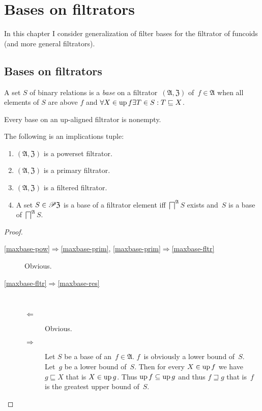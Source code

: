 \chapter{Bases on filtrators}

In this chapter I consider generalization of filter bases
for the filtrator of funcoids (and more general filtrators).

\section{Bases on filtrators}

\begin{defn}
  A set $S$ of binary relations is a \emph{base} on a filtrator~$(\mathfrak{A},\mathfrak{Z})$
  of~$f\in\mathfrak{A}$ when all elements
  of $S$ are above $f$ and $\forall X \in \operatorname{up} f \exists T \in S : T \sqsubseteq X$.
\end{defn}

\begin{obvious}
Every base on an up-aligned filtrator is nonempty.
\end{obvious}

\begin{prop}
The following is an implications tuple:
\begin{enumerate}
\item\label{maxbase-pow} $(\mathfrak{A},\mathfrak{Z})$ is a powerset filtrator.
\item\label{maxbase-prim} $(\mathfrak{A},\mathfrak{Z})$ is a primary filtrator.
\item\label{maxbase-fltr} $(\mathfrak{A},\mathfrak{Z})$ is a filtered filtrator.
\item\label{maxbase-res} A set $S\in\mathscr{P}\mathfrak{Z}$ is a base of a filtrator element iff
  $\bigsqcap^{\mathfrak{A}} S$ exists and~$S$ is a base of $\bigsqcap^{\mathfrak{A}} S$.
\end{enumerate}  
\end{prop}

\begin{proof}
  ~
  \begin{description}
  \item[\ref{maxbase-pow}$\Rightarrow$\ref{maxbase-prim}, \ref{maxbase-prim}$\Rightarrow$\ref{maxbase-fltr}] Obvious.

  \item[\ref{maxbase-fltr}$\Rightarrow$\ref{maxbase-res}]
    ~
    \begin{description}
      \item[$\Leftarrow$] Obvious.
      
      \item[$\Rightarrow$] Let $S$ be a base of an~$f\in\mathfrak{A}$.
      $f$~is obviously a lower bound of~$S$. Let~$g$ be a lower bound of~$S$.
      Then for every $X\in\operatorname{up} f$ we have $g\sqsubseteq X$ that is $X\in\operatorname{up} g$.
      Thus $\operatorname{up} f\subseteq\operatorname{up} g$ and thus $f\sqsupseteq g$ that is~$f$ is the greatest upper bound of~$S$.
    \end{description}
  \end{description}
\end{proof}

